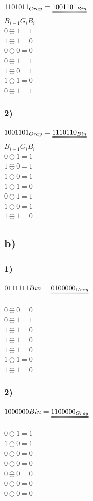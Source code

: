 \documentclass[12pt,norsk,a4paper]{article}
\newcommand*\xor{\mathbin{\oplus}}
\begin{document}
$1101011_{Gray} = \uuline{1001101_{Bin}}$\\
$B_{i-1}  G_i  B_i$\\
$0 \xor 1 = 1$\\
$1 \xor 1 = 0$\\
$0 \xor 0 = 0$\\
$0 \xor 1 = 1$\\
$1 \xor 0 = 1$\\
$1 \xor 1 = 0$\\
$0 \xor 1 = 1$\\



\subsubsection{2)}
$1001101_{Gray} = \uuline{1110110_{Bin}}$\\
$B_{i-1}  G_i  B_i$\\
$ 0 \xor 1 = 1 $\\
$ 1 \xor 0 = 1 $\\
$ 1 \xor 0 = 1 $\\
$ 1 \xor 1 = 0 $\\
$ 0 \xor 1 = 1 $\\
$ 1 \xor 0 = 1 $\\
$ 1 \xor 1 = 0 $\\


\clearpage
\subsection{b)}
\subsubsection{1)}
$0111111{Bin} = \uuline{0100000_{Grey}}$
  
$ 0 \xor 0 = 0 $\\
$ 0 \xor 1 = 1 $\\
$ 1 \xor 1 = 0 $\\
$ 1 \xor 1 = 0 $\\
$ 1 \xor 1 = 0 $\\
$ 1 \xor 1 = 0 $\\
$ 1 \xor 1 = 0 $\\

\subsubsection{2)}
$1000000{Bin} = \uuline{1100000_{Grey}}$
  
$ 0 \xor 1 = 1 $\\
$ 1 \xor 0 = 1 $\\
$ 0 \xor 0 = 0 $\\
$ 0 \xor 0 = 0 $\\
$ 0 \xor 0 = 0 $\\
$ 0 \xor 0 = 0 $\\
$ 0 \xor 0 = 0 $\\
\clearpage
\end{document}
